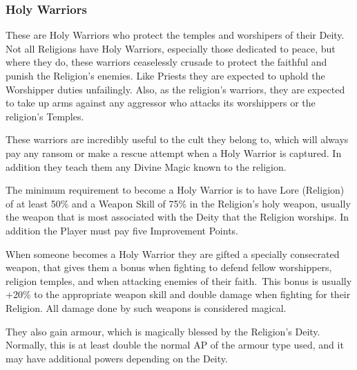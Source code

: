 \subsubsection{Holy Warriors}
These are Holy Warriors who protect the temples and worshipers of their Deity. Not all Religions have Holy Warriors, especially those dedicated to peace, but where they do, these warriors ceaselessly crusade to protect the faithful and punish the Religion’s enemies. Like Priests they are expected to uphold the Worshipper duties unfailingly. Also, as the religion’s warriors, they are expected to take up arms against any aggressor who attacks its worshippers or the religion’s Temples.

These warriors are incredibly useful to the cult they belong to, which will always pay any ransom or make a rescue attempt when a Holy Warrior is captured. In addition they teach them any Divine Magic known to the religion.

The minimum requirement to become a Holy Warrior is to have Lore (Religion) of at least 50\% and a Weapon Skill of 75\% in the Religion’s holy weapon, usually the weapon that is most associated with the Deity that the Religion worships. In addition the Player must pay five Improvement Points.

When someone becomes a Holy Warrior they are gifted a specially consecrated weapon, that gives them a bonus when fighting to defend fellow worshippers, religion temples, and when attacking enemies of their faith. This bonus is usually +20\% to the appropriate weapon skill and double damage when fighting for their Religion. All damage done by such weapons is considered magical.

They also gain armour, which is magically blessed by the Religion’s Deity. Normally, this is at least double the normal AP of the armour type used, and it may have additional powers depending on the Deity.


